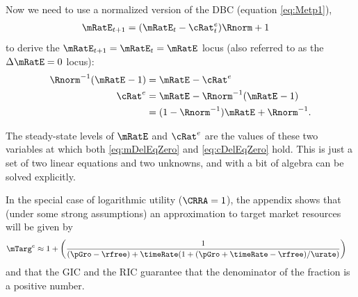 \documentclass{handout}
\begin{document}
Now we need to use a normalized version of the DBC (equation \eqref{eq:Metp1}),
\begin{equation}\begin{gathered}\begin{aligned}
        \mRatE_{t+1} & =  (\mRatE_{t}-{\cRat}^{e}_{t})\Rnorm+1 \label{eq:metp1}
\end{aligned}\end{gathered}\end{equation}
to derive the $\mRatE_{t+1}=\mRatE_{t}=\mRatE_{\tSS}$ locus (also referred
to as the $\dmEqZero$ locus): 
\begin{equation}\begin{gathered}\begin{aligned}
      \Rnorm^{-1}(\mRatE_{\tSS}-1) & =  \mRatE_{\tSS}-{\cRat}^{e}_{\tSS}
\\      {\cRat}^{e}_{\tSS} & =  \mRatE_{\tSS}-\Rnorm^{-1}(\mRatE_{\tSS}-1)
\\       & =  (1-\Rnorm^{-1})\mRatE_{\tSS}+\Rnorm^{-1}. \label{eq:mDelEqZero}
\end{aligned}\end{gathered}\end{equation}

The steady-state levels of $\mRatE$ and ${\cRat}^{e}$ are the values of these two variables at which both
\eqref{eq:mDelEqZero} and \eqref{eq:cDelEqZero} hold.  This is
just a set of two linear equations and two unknowns, and with a bit of 
algebra can be solved explicitly.

In the special case of logarithmic utility ($\CRRA = 1$), the
appendix shows that (under some strong assumptions) an approximation to target market resources will be given by
\begin{equation}\begin{gathered}\begin{aligned}
 \mTarg^{e} & \approx  1 + \left(\frac{1}{(\pGro-\rfree)+\timeRate(1+(\pGro+\timeRate-\rfree)/\urate)}\right) \label{eq:mTargetLogCase}
\end{aligned}\end{gathered}\end{equation}
and that the GIC and the RIC guarantee that the denominator of the fraction is a positive number.
\end{document}
